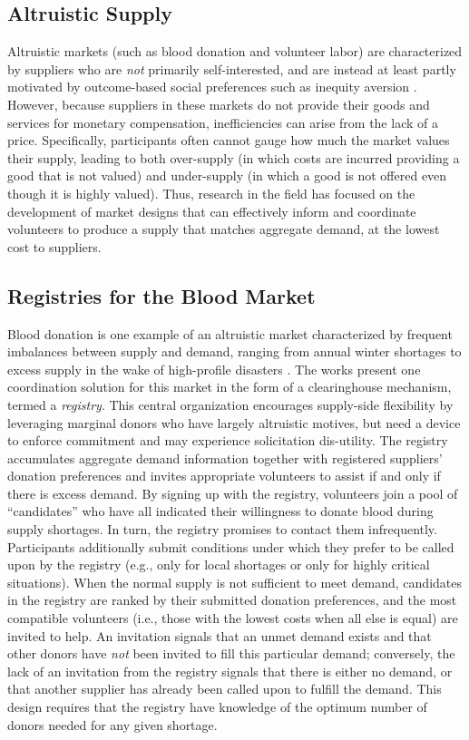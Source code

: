 \documentclass[11pt, margin=1in]{article}
\begin{document}
\subsection{Altruistic Supply}
Altruistic markets (such as blood donation and volunteer labor) are characterized by suppliers who are \textit{not} primarily self-interested, and are instead at least partly motivated by outcome-based social preferences such as inequity aversion \cite{volunteer-registry}. However, because suppliers in these markets do not provide their goods and services for monetary compensation, inefficiencies can arise from the lack of a price. Specifically, participants often cannot gauge how much the market values their supply, leading to both over-supply (in which costs are incurred providing a good that is not valued) and under-supply (in which a good is not offered even though it is highly valued). Thus,  research in the field has focused on the development of market designs that can effectively inform and coordinate volunteers to produce a supply that matches aggregate demand, at the lowest cost to suppliers. 

\subsection{Registries for the Blood Market}
Blood donation is one example of an altruistic market characterized by frequent imbalances between supply and demand, ranging from annual winter shortages to excess supply in the wake of high-profile disasters \cite{blood-market}. The works \cite{blood-registry, volunteer-registry} present one coordination solution for this market in the form of a clearinghouse mechanism, termed a \textit{registry}. This central organization encourages supply-side flexibility by leveraging marginal donors who have largely altruistic motives, but need a device to enforce commitment and may experience solicitation dis-utility. The registry accumulates aggregate demand information together with registered suppliers' donation preferences and invites appropriate volunteers to assist if and only if there is excess demand. By signing up with the registry, volunteers join a pool of ``candidates'' who have all indicated their willingness to donate blood during supply shortages. In turn, the registry promises to contact them infrequently. Participants additionally submit conditions under which they prefer to be called upon by the registry (e.g., only for local shortages or only for highly critical situations). When the normal supply is not sufficient to meet demand, candidates in the registry are ranked by their submitted donation preferences, and the most compatible volunteers (i.e., those with the lowest costs when all else is equal) are invited to help. An invitation signals that an unmet demand exists and that other donors have \textit{not} been invited to fill this particular demand; conversely, the lack of an invitation from the registry signals that there is either no demand, or that another supplier has already been called upon to fulfill the demand. This design requires that the registry have knowledge of the optimum number of donors needed for any given shortage.
\end{document}
